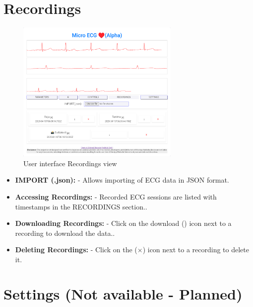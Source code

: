 \section{Recordings}
\begin{figure}[H]
    \centering
    \includegraphics[width=0.7\textwidth]{images/ss/view-record.png}
    \caption{User interface Recordings view}
    \label{fig:ss_record_view}
\end{figure}
\begin{itemize}[leftmargin=*]
    \item \textbf{IMPORT (.json):} -  Allows importing of ECG data in JSON format.
    
    \item \textbf{Accessing Recordings:} -  Recorded ECG sessions are listed with timestamps in the RECORDINGS section..​
    \item \textbf{Downloading Recordings:} -  Click on the download (\downleftarrow) icon next to a recording to download the data..​
    \item \textbf{Deleting Recordings:} -  Click on the ($\times$) icon next to a recording to delete it.
\end{itemize}

\section{Settings (Not available - Planned)}

